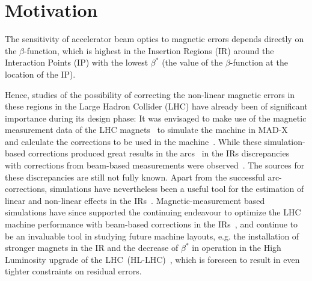 \section{Motivation}


The sensitivity of accelerator beam optics to magnetic errors depends directly on the $\beta$-function, 
which is highest in the Insertion Regions (IR) around the Interaction Points (IP) 
with the lowest $\beta^*$ (the value of the $\beta$-function at the location of the IP).

Hence, studies of the possibility of correcting the non-linear magnetic errors in these regions in the Large Hadron Collider (LHC)
have already been of significant importance during its design phase:
It was envisaged to make use of the magnetic measurement data of the LHC 
magnets~\cite{SammutMathematicalFormulationPredict2006,SammutMathematicalFormulationPredict2007,SammutMathematicalFormulationPredict2009} to
simulate the machine in MAD-X~\cite{DeniauMADXUserGuide} and calculate the corrections to be used in the
machine~\cite{BruningFieldQualityIssues2004,BruningDynamicApertureStudies2004,TomasNonlinearCorrectionSchemes2009}.
While these simulation-based corrections produced great results in the arcs~\cite{PerssonChromaticCouplingCorrection2013}
in the IRs discrepancies with corrections from beam-based measurements
were observed~\cite{MacleanFirstMeasurementCorrection2015}.
The sources for these discrepancies are still not fully known.
Apart from the successful arc-corrections, 
simulations have nevertheless been a useful tool for the estimation of linear and non-linear 
effects in the IRs~\cite{MacleanNewApproachLHC2019,MacleanFirstMeasurementCorrection2015,
TomasCERNLargeHadron2010,DillyAmplitudeDetuningMisaligned2020}.
Magnetic-measurement based simulations have since supported 
the continuing endeavour to optimize the LHC machine performance
with beam-based corrections in the IRs~\cite{MacleanCommissioningNonlinearOptics2016,
MacleanNewMethodsMeasurement2017,MacleanNewLHCOptics2017,MacleanDetailedReviewLHC2019,
MacleanNewApproachLHC2019,MacleanProspectsBeambasedStudy2022},
and continue to be an invaluable tool in studying future machine layouts,
e.g. the installation of stronger magnets in the IR and the decrease of $\beta^*$ in operation in the High Luminosity upgrade of the 
LHC~(HL-LHC)~\cite{FartoukhHLLHCAcceleratorPhysics2015,BejarAlonsoHighLuminosityLargeHadron2020},
which is foreseen to result in even tighter constraints on residual errors. 

